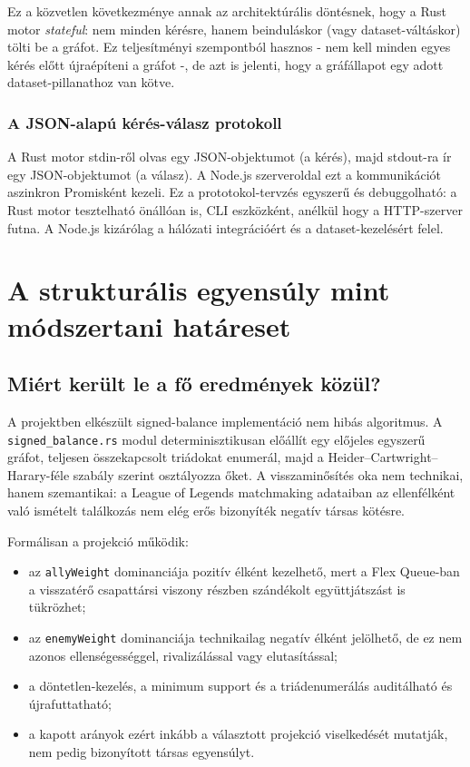 ﻿\documentclass[a4paper,12pt]{report}
\begin{document}
Ez a közvetlen következménye annak az architektúrális döntésnek, hogy a Rust motor \emph{stateful}: nem minden kérésre, hanem beinduláskor (vagy dataset-váltáskor) tölti be a gráfot. Ez teljesítményi szempontból hasznos - nem kell minden egyes kérés előtt újraépíteni a gráfot -, de azt is jelenti, hogy a gráfállapot egy adott dataset-pillanathoz van kötve.

\subsection{A JSON-alapú kérés-válasz protokoll}

A Rust motor stdin-ről olvas egy JSON-objektumot (a kérés), majd stdout-ra ír egy JSON-objektumot (a válasz). A Node.js szerveroldal ezt a kommunikációt aszinkron Promisként kezeli. Ez a prototokol-tervzés egyszerű és debuggolható: a Rust motor tesztelható önállóan is, CLI eszközként, anélkül hogy a HTTP-szerver futna. A Node.js kizárólag a hálózati integrációért és a dataset-kezelésért felel.

\chapter{A strukturális egyensúly mint módszertani határeset}

\section{Miért került le a fő eredmények közül?}

A projektben elkészült signed-balance implementáció nem hibás algoritmus. A \texttt{signed\_balance.rs} modul determinisztikusan előállít egy előjeles egyszerű gráfot, teljesen összekapcsolt triádokat enumerál, majd a Heider--Cartwright--Harary-féle szabály szerint osztályozza őket. A visszaminősítés oka nem technikai, hanem szemantikai: a League of Legends matchmaking adataiban az ellenfélként való ismételt találkozás nem elég erős bizonyíték negatív társas kötésre.

Formálisan a projekció működik:

\begin{itemize}
    \item az \texttt{allyWeight} dominanciája pozitív élként kezelhető, mert a Flex Queue-ban a visszatérő csapattársi viszony részben szándékolt együttjátszást is tükrözhet;
    \item az \texttt{enemyWeight} dominanciája technikailag negatív élként jelölhető, de ez nem azonos ellenségességgel, rivalizálással vagy elutasítással;
    \item a döntetlen-kezelés, a minimum support és a triádenumerálás auditálható és újrafuttatható;
    \item a kapott arányok ezért inkább a választott projekció viselkedését mutatják, nem pedig bizonyított társas egyensúlyt.
\end{itemize}
\end{document}
